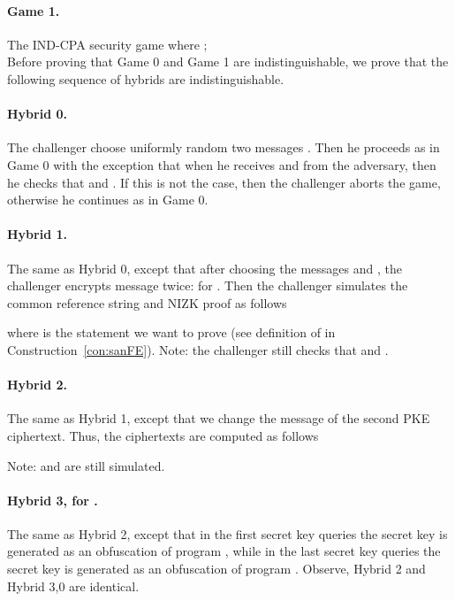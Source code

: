 \documentclass{llncs}
\begin{document}
\paragraph{Game 1.} The IND-CPA security game where ; \\

Before proving that Game 0 and Game 1 are indistinguishable, we prove that the following sequence of hybrids are indistinguishable. 

\paragraph{Hybrid 0.} The challenger choose uniformly random two messages . Then he proceeds as in Game 0 with the exception that when he receives  and  from the adversary, then he checks that  and . If this is not the case, then the challenger aborts the game, otherwise he continues as in Game 0.

\paragraph{Hybrid 1.} The same as Hybrid 0, except that after choosing the messages  and , the challenger encrypts message  twice:  for . Then the challenger simulates the common reference string  and NIZK proof  as follows
	
	where  is the statement we want to prove (see definition of  in Construction~\ref{con:sanFE}). Note: the challenger still checks that  and .

\paragraph{Hybrid 2.} The same as Hybrid 1, except that we change the message of the second PKE ciphertext. Thus, the ciphertexts are computed as follows
	
	Note:  and  are still simulated.

\paragraph{Hybrid 3, for .} The same as Hybrid 2, except that in the first  secret key queries the secret key is generated as an obfuscation of program , while in the last  secret key queries the secret key is generated as an obfuscation of program .
Observe, Hybrid 2 and Hybrid 3,0 are identical.
\end{document}

